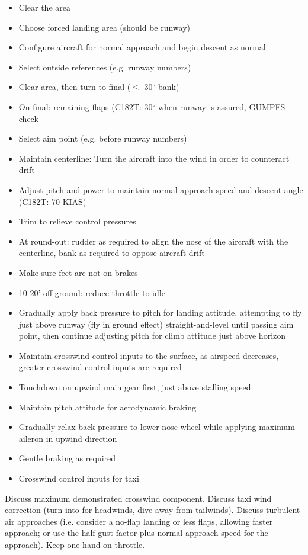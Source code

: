 \begin{itemize}
  \item Clear the area
  \item Choose forced landing area (should be runway)
  \item Configure aircraft for normal approach and begin descent as normal
  \item Select outside references (e.g. runway numbers)
  \item Clear area, then turn to final ($\leq$ 30$^\circ$ bank)
  \item On final: remaining flaps (C182T: 30$^\circ$ when runway is assured,
    GUMPFS check
  \item Select aim point (e.g. before runway numbers)
  \item Maintain centerline: Turn the aircraft into the wind in order to
    counteract drift
  \item Adjust pitch and power to maintain normal approach speed and descent
    angle (C182T: 70 KIAS)
  \item Trim to relieve control pressures
  \item At round-out: rudder as required to align the nose of the aircraft with
    the centerline, bank as required to oppose aircraft drift
  \item Make sure feet are not on brakes
  \item 10-20' off ground: reduce throttle to idle
  \item Gradually apply back pressure to pitch for landing attitude, attempting
    to fly just above runway (fly in ground effect) straight-and-level until
    passing aim point, then continue adjusting pitch for climb attitude just
    above horizon
  \item Maintain crosswind control inputs to the surface, as airspeed
    decreases, greater crosswind control inputs are required 
  \item Touchdown on upwind main gear first, just above stalling speed
  \item Maintain pitch attitude for aerodynamic braking
  \item Gradually relax back pressure to lower nose wheel while applying
    maximum aileron in upwind direction
  \item Gentle braking as required
  \item Crosswind control inputs for taxi
\end{itemize}

Discuss maximum demonstrated crosswind component. Discuss taxi wind correction
(turn into for headwinds, dive away from tailwinds). Discuss turbulent air
approaches (i.e. consider a no-flap landing or less flaps, allowing faster
approach; or use the half gust factor plus normal approach speed for the
approach). Keep one hand on throttle.

